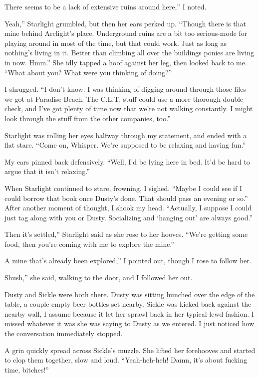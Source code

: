 \leavevmode{}There seems to be a lack of extensive ruins around here,” I noted.

\leavevmode{}Yeah,” Starlight grumbled, but then her ears perked up. “Though there is that mine behind Arclight’s place. Underground ruins are a bit too serious-mode for playing around in most of the time, but that could work. Just as long as nothing’s living in it. Better than climbing all over the buildings ponies are living in now. Hmm.” She idly tapped a hoof against her leg, then looked back to me. “What about you? What were you thinking of doing?”

I shrugged. “I don’t know. I was thinking of digging around through those files we got at Paradise Beach. The C.L.T. stuff could use a more thorough double-check, and I’ve got plenty of time now that we’re not walking constantly. I might look through the stuff from the other companies, too.”

Starlight was rolling her eyes halfway through my statement, and ended with a flat stare. “Come on, Whisper. We’re supposed to be relaxing and having fun.”

My ears pinned back defensively. “Well, I’d be lying here in bed. It’d be hard to argue that it isn’t relaxing.”

When Starlight continued to stare, frowning, I sighed. “Maybe I could see if I could borrow that book once Dusty’s done. That should pass an evening or so.” After another moment of thought, I shook my head. “Actually, I suppose I could just tag along with you or Dusty. Socializing and ‘hanging out’ are always good.”

\leavevmode{}Then it’s settled,” Starlight said as she rose to her hooves. “We’re getting some food, then you’re coming with me to explore the mine.”

\leavevmode{}A mine that’s already been explored,” I pointed out, though I rose to follow her.

\leavevmode{}Shush,” she said, walking to the door, and I followed her out.

Dusty and Sickle were both there. Dusty was sitting hunched over the edge of the table, a couple empty beer bottles set nearby. Sickle was kicked back against the nearby wall, I assume because it let her sprawl back in her typical lewd fashion. I missed whatever it was she was saying to Dusty as we entered. I just noticed how the conversation immediately stopped.

A grin quickly spread across Sickle’s muzzle. She lifted her forehooves and started to clop them together, slow and loud. “Yeah-heh-heh! Damn, it’s about fucking time, bitches!”

